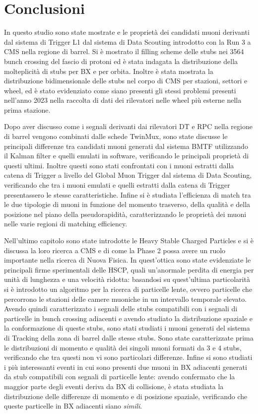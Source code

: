 \chapter{Conclusioni}
\label{cap:Conclusioni}

In questo studio sono state mostrate e le proprietà dei candidati muoni derivanti dal sistema di Trigger L1 dal sistema di Data Scouting introdotto con la Run 3 a CMS nella regione di barrel. Si è mostrato il filling scheme delle stubs nei 3564 bunch crossing del fascio di protoni ed è stata indagata la distribuzione della molteplicità di stubs per BX e per orbita. Inoltre è stata mostrata la distribuzione bidimensionale delle stubs nel corpo di CMS per stazioni, settori e wheel, ed è stato evidenziato come siano presenti gli stessi problemi presenti nell'anno 2023 nella raccolta di dati dei rilevatori nelle wheel più esterne nella prima stazione.

Dopo aver discusso come i segnali derivanti dai rilevatori DT e RPC nella regione di barrel vengono combinati dalle schede TwinMux, sono state discusse le principali differenze tra candidati muoni generati dal sistema BMTF utilizzando il Kalman filter e quelli emulati in software, verificando le principali proprietà di questi ultimi. Inoltre questi sono stati confrontati con i muoni estratti dalla catena di Trigger a livello del Global Muon Trigger dal sistema di Data Scouting, verificando che tra i muoni emulati e quelli estratti dalla catena di Trigger presentassero le stesse caratteristiche. Infine si è studiata l'efficienza di match tra le due tipologie di muoni in funzione del momento trasverso, della qualità e della posizione nel piano della pseudorapidità, caratterizzando le proprietà dei muoni nelle varie regioni di matching efficiency. 


Nell'ultimo capitolo sono state introdotte le Heavy Stable Charged Particles e si è discussa la loro ricerca a CMS e di come la Phase 2 possa avere un ruolo importante nella ricerca di Nuova Fisica. In quest'ottica sono state evidenziate le principali firme sperimentali delle HSCP, quali un'anormale perdita di energia per unità di lunghezza e una velocità ridotta: basandosi su quest'ultima particolarità si è introdotto un algoritmo per la ricerca di particelle lente, ovvero particelle che percorrono le stazioni delle camere muoniche in un intervallo temporale elevato.\newline
Avendo quindi caratterizzato i segnali delle stubs compatibili con i segnali di particelle in bunch crossing adiacenti e avendo studiato la distribuzione spaziale e la conformazione di queste stubs, sono stati studiati i muoni generati del sistema di Tracking della zona di barrel dalle stesse stubs.
Sono state caratterizzate prima le distribuzioni di momento e qualità dei singoli muoni formati da 3 e 4 stubs, verificando che tra questi non vi sono particolari differenze. Infine si sono studiati i più interessanti eventi in cui sono presenti due muoni in BX adiacenti generati da stub compatibili con segnali di particelle lente: avendo confermato che la maggior parte degli eventi deriva da BX di collisione, è stata studiata la distribuzione delle differenze di momento e di posizione spaziale, verificando che queste particelle in BX adiacenti siano \textit{simili}. 